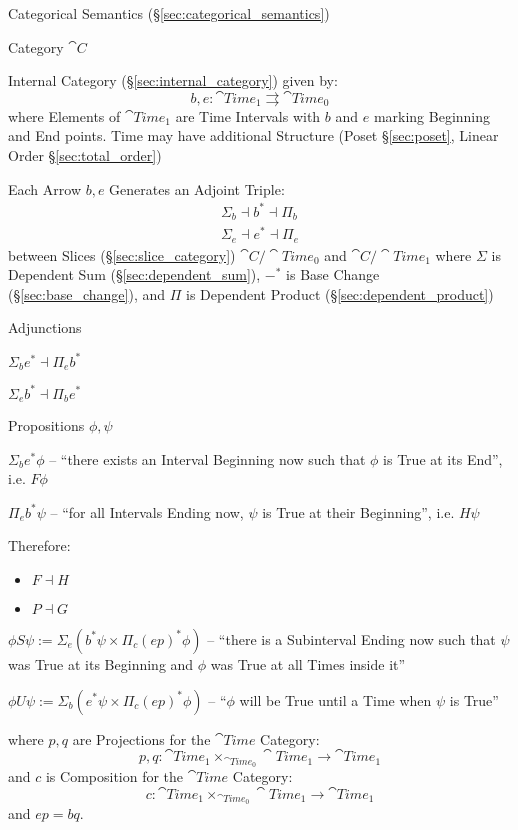 Categorical Semantics (\S\ref{sec:categorical_semantics})

Category $\cat{C}$

Internal Category (\S\ref{sec:internal_category}) given by:
\[
  b,e : \cat{Time}_1 \rightrightarrows \cat{Time}_0
\]
where Elements of $\cat{Time}_1$ are Time Intervals with $b$ and $e$
marking Beginning and End points. Time may have additional Structure
(Poset \S\ref{sec:poset}, Linear Order \S\ref{sec:total_order})

Each Arrow $b,e$ Generates an Adjoint Triple:
\begin{align*}
  \Sigma_b \dashv b^* \dashv \Pi_b \\
  \Sigma_e \dashv e^* \dashv \Pi_e
\end{align*}
between Slices (\S\ref{sec:slice_category}) $\cat{C}/\cat{Time}_0$ and
$\cat{C}/\cat{Time}_1$ where $\Sigma$ is Dependent Sum
(\S\ref{sec:dependent_sum}), $-^*$ is Base Change
(\S\ref{sec:base_change}), and $\Pi$ is Dependent Product
(\S\ref{sec:dependent_product})

Adjunctions

$\Sigma_b e^* \dashv \Pi_e b^*$

$\Sigma_e b^* \dashv \Pi_b e^*$

Propositions $\phi, \psi$

$\Sigma_b e^* \phi$ -- ``there exists an Interval Beginning now such
that $\phi$ is True at its End'', i.e. $F \phi$

$\Pi_e b^* \psi$ -- ``for all Intervals Ending now, $\psi$ is True at
their Beginning'', i.e. $H \psi$

Therefore:
\begin{itemize}
  \item $F \dashv H$
  \item $P \dashv G$
\end{itemize}

$\phi S \psi := \Sigma_e (b^* \psi \times \Pi_c(ep)^*\phi)$ -- ``there
is a Subinterval Ending now such that $\psi$ was True at its Beginning
and $\phi$ was True at all Times inside it''

$\phi U \psi := \Sigma_b (e^* \psi \times \Pi_c(ep)^*\phi)$ --
``$\phi$ will be True until a Time when $\psi$ is True''

where $p,q$ are Projections for the $\cat{Time}$ Category:
\[
  p,q : \cat{Time}_1 \times_{\cat{Time}_0} \cat{Time}_1
    \rightarrow \cat{Time}_1
\]
and $c$ is Composition for the $\cat{Time}$ Category:
\[
  c : \cat{Time}_1 \times_{\cat{Time}_0} \cat{Time}_1
    \rightarrow \cat{Time}_1
\]
and $ep = bq$.

